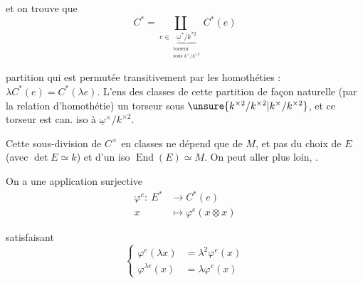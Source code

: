 et on trouve que
\[
 C^*=\coprod_{e\in\underbrace{\underline{\omega}^*/k^{*2}}_{\substack{\text{torseur}\\\text{sous }k^\times/k^{\times2}}}}C^*(e)
\]

partition qui est permutée transitivement par les homothéties  :  $\lambda C^*(e)=C^*(\lambda e)$. L'ens des classes de cette partition   de façon naturelle (par la relation d'homothétie) un torseur sous $\unsure{k^{\times2}/k^{\times2}|k^\times/k^{\times2}}$, et ce torseur est can. iso à $\underline{\omega}^\times/k^{\times2}$.

Cette sous-division de $C^\times$ en classes ne dépend que de $M$, et pas du choix de $E$ (avec $\det E\simeq k$) et d'un iso $\operatorname{End}(E)\simeq M$. On peut aller plus loin, .


On  a une application surjective
\[
 \begin{aligned}\varphi^e:\ E^*&\longrightarrow C^*(e)\\
 x&\longmapsto\varphi^e(x\otimes x)\end{aligned}
\]

satisfaisant 
\[
 \left\{\begin{aligned}
 \varphi^e(\lambda x)&=\lambda^2\varphi^e(x)\\
 \varphi^{\lambda e}(x)&=\lambda\varphi^e(x)
 \end{aligned}\right.
\]

